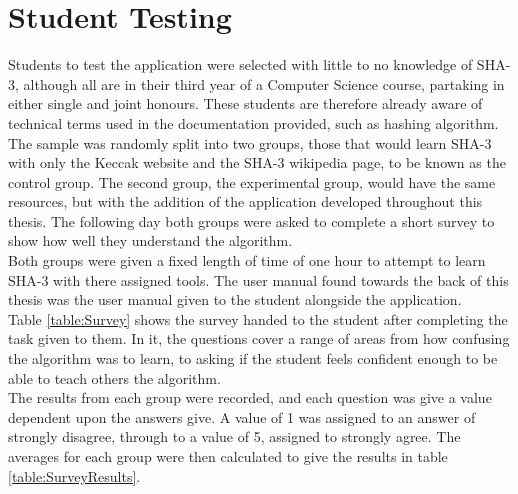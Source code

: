 \section{Student Testing}
Students to test the application were selected with little to no knowledge of SHA-3, although all are in their third year of a Computer Science course, partaking in either single and joint honours. These students are therefore already aware of technical terms used in the documentation provided, such as hashing algorithm.
\vspace{5mm}\\
The sample was randomly split into two groups, those that would learn SHA-3 with only the Keccak website\cite{KeccakSite} and the SHA-3 wikipedia page\cite{SHA3Wiki}, to be known as the control group. The second group, the experimental group, would have the same resources, but with the addition of the application developed throughout this thesis. The following day both groups were asked to complete a short survey to show how well they understand the algorithm.
\vspace{5mm}\\
Both groups were given a fixed length of time of one hour to attempt to learn SHA-3 with there assigned tools. The user manual found towards the back of this thesis was the user manual given to the student alongside the application.
\vspace{5mm}\\
Table \ref{table:Survey} shows the survey handed to the student after completing the task given to them. In it, the questions cover a range of areas from how confusing the algorithm was to learn, to asking if the student feels confident enough to be able to teach others the algorithm.
\vspace{5mm}\\
The results from each group were recorded, and each question was give a value dependent upon the answers give. A value of 1 was assigned to an answer of strongly disagree, through to a value of 5, assigned to strongly agree. The averages for each group were then calculated to give the results in table \ref{table:SurveyResults}.
